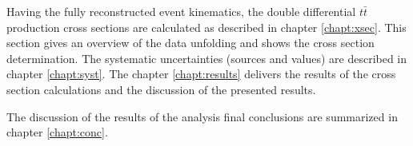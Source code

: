 Having the fully reconstructed event kinematics, the double differential $t\bar{t}$ production cross sections are calculated
as described in chapter \ref{chapt:xsec}. This section gives an overview of the data unfolding and shows the cross section determination. 
The systematic uncertainties (sources and values) are described in chapter \ref{chapt:syst}. The chapter \ref{chapt:results} 
delivers the results of the cross section calculations and the discussion of the presented results.

The discussion of the results of the analysis final conclusions are summarized in chapter \ref{chapt:conc}.